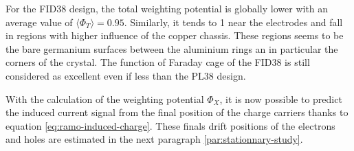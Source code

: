 For the FID38 design, the total weighting potential is globally lower with an average value of $\langle \Phi_T \rangle = 0.95$. Similarly, it tends to 1 near the electrodes and fall in regions with higher influence of the copper chassis. These regions seems to be the bare germanium surfaces between the aluminium rings an in particular the corners of the crystal. The function of Faraday cage of the FID38 is still considered as excellent even if less than the PL38 design.




With the calculation of the weighting potential $\Phi_X$, it is now possible to predict the induced current signal from the final position of the charge carriers thanks to equation \ref{eq:ramo-induced-charge}. These finals drift positions of the electrons and holes are estimated in the next paragraph \ref{par:stationnary-study}.


